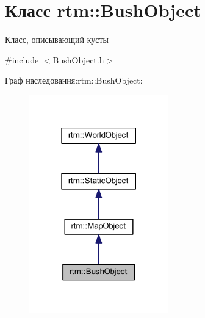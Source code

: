 \hypertarget{classrtm_1_1_bush_object}{}\section{Класс rtm\+:\+:Bush\+Object}
\label{classrtm_1_1_bush_object}


Класс, описывающий кусты  




{\ttfamily \#include $<$Bush\+Object.\+h$>$}



Граф наследования\+:rtm\+:\+:Bush\+Object\+:
\nopagebreak
\begin{figure}[H]
\begin{center}
\leavevmode
\includegraphics[width=171pt]{classrtm_1_1_bush_object__inherit__graph}
\end{center}
\end{figure}
